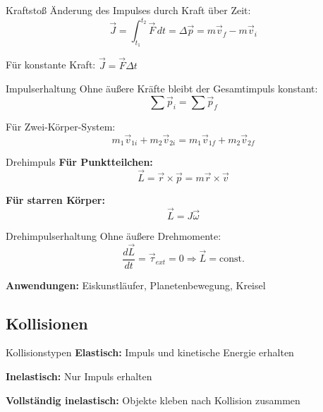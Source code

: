 \begin{definition}{Kraftstoß}
    Änderung des Impulses durch Kraft über Zeit:
    \begin{equation}
        \vec{J} = \int_{t_1}^{t_2} \vec{F} \, dt = \Delta\vec{p} = m\vec{v}_f - m\vec{v}_i
    \end{equation}
    
    Für konstante Kraft: $\vec{J} = \vec{F}\Delta t$
\end{definition}

\begin{concept}{Impulserhaltung}
    Ohne äußere Kräfte bleibt der Gesamtimpuls konstant:
    \begin{equation}
        \sum \vec{p}_i = \sum \vec{p}_f
    \end{equation}
    
    Für Zwei-Körper-System:
    \begin{equation}
        m_1\vec{v}_{1i} + m_2\vec{v}_{2i} = m_1\vec{v}_{1f} + m_2\vec{v}_{2f}
    \end{equation}
\end{concept}

\begin{definition}{Drehimpuls}
    \textbf{Für Punktteilchen:}
    \begin{equation}
        \vec{L} = \vec{r} \times \vec{p} = m\vec{r} \times \vec{v}
    \end{equation}
    
    \textbf{Für starren Körper:}
    \begin{equation}
        \vec{L} = J\vec{\omega}
    \end{equation}
\end{definition}

\begin{concept}{Drehimpulserhaltung}
    Ohne äußere Drehmomente:
    \begin{equation}
        \frac{d\vec{L}}{dt} = \vec{\tau}_{ext} = 0 \Rightarrow \vec{L} = \text{const.}
    \end{equation}
    
    \textbf{Anwendungen:} Eiskunstläufer, Planetenbewegung, Kreisel
\end{concept}

\subsection{Kollisionen}

\begin{definition}{Kollisionstypen}
    \textbf{Elastisch:} Impuls und kinetische Energie erhalten
    
    \textbf{Inelastisch:} Nur Impuls erhalten
    
    \textbf{Vollständig inelastisch:} Objekte kleben nach Kollision zusammen
\end{definition}

